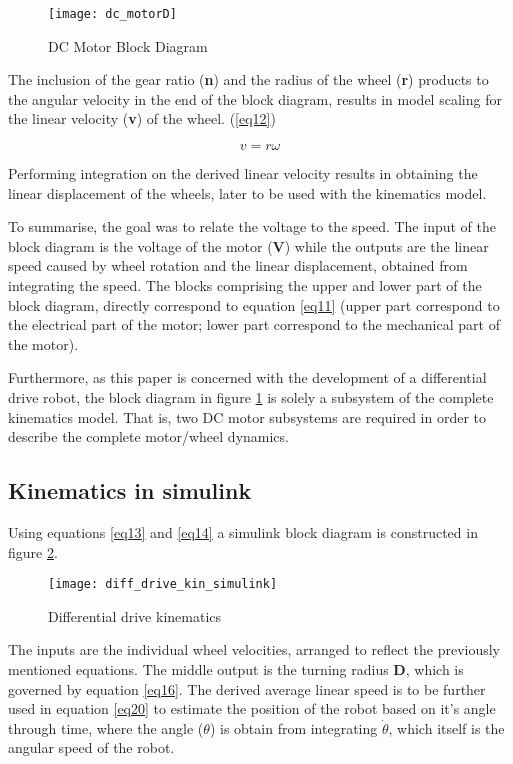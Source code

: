 \begin{figure}[h]
\centering
\texttt{[image: dc\_motorD]}
\caption{DC Motor Block Diagram}
\label{fig::dcmfigure}
\end{figure}

The inclusion of the gear ratio (\textbf{n}) and the radius of the wheel (\textbf{r}) products to the angular velocity in the end of the block diagram, results in model scaling for the linear velocity (\textbf{v}) of the wheel. (\ref{eq12})

\begin{equation} \label{eq12}
v = r\omega
\end{equation}

Performing integration on the derived linear velocity results in obtaining the linear displacement of the wheels, later to be used with the kinematics model. 

To summarise, the goal was to relate the voltage to the speed. The input of the block diagram is the voltage of the motor (\textbf{V}) while the outputs are the linear speed caused by wheel rotation and the linear displacement, obtained from integrating the speed. The blocks comprising the upper and lower part of the block diagram, directly correspond to equation \ref{eq11} (upper part correspond to the electrical part of the motor; lower part correspond to the mechanical part of the motor).

Furthermore, as this paper is concerned with the development of a differential drive robot, the block diagram in figure \ref{fig::dcmfigure} is solely a subsystem of the complete kinematics model. That is, two DC motor subsystems are required in order to describe the complete motor/wheel dynamics. 


\subsection{Kinematics in simulink} 

Using equations \ref{eq13} and \ref{eq14} a simulink block diagram is constructed in figure \ref{fig::diff_simulink}.

\begin{figure}[h]
\centering
\texttt{[image: diff\_drive\_kin\_simulink]}
\caption{Differential drive kinematics}
\label{fig::diff_simulink}
\end{figure} 

The inputs are the individual wheel velocities, arranged to reflect the previously mentioned equations. The middle output is the turning radius \textbf{D}, which is governed by equation \ref{eq16}. The derived average linear speed is to be further used in equation \ref{eq20} to estimate the position of the robot based on it's angle through time, where the angle ($\theta$) is   obtain from integrating $\dot{\theta}$, which itself is the angular speed of the robot. 

